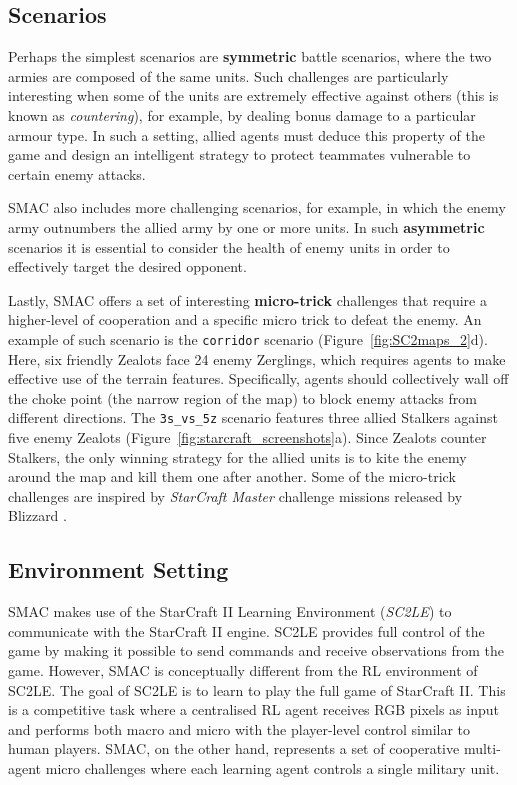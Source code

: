 \documentclass[twoside,11pt]{article}
\renewcommand{\cite}{\citep}
\begin{document}
\subsection{Scenarios}\label{appendix:SMAC_scenarios}

Perhaps the simplest scenarios are \textbf{symmetric} battle scenarios, where the two armies are composed of the same units.
Such challenges are particularly interesting when some of the units are extremely effective against others (this is known as \textit{countering}), for example, by dealing bonus damage to a particular armour type.
In such a setting, allied agents must deduce this property of the game and design an intelligent strategy to protect teammates vulnerable to certain enemy attacks.

SMAC also includes more challenging scenarios, for example, in which the enemy army outnumbers the allied army by one or more units. In such \textbf{asymmetric} scenarios it is essential to consider the health of enemy units in order to effectively target the desired opponent.

Lastly, SMAC offers a set of interesting \textbf{micro-trick} challenges that require a higher-level of cooperation and a specific micro trick to defeat the enemy. 
An example of such scenario is the \texttt{corridor} scenario (Figure~\ref{fig:SC2maps_2}d). Here, six friendly Zealots face 24 enemy Zerglings, which requires agents to make effective use of the terrain features. Specifically, agents should collectively wall off the choke point (the narrow region of the map) to block enemy attacks from different directions. 
The \texttt{3s\_vs\_5z} scenario features three allied Stalkers against five enemy Zealots (Figure~\ref{fig:starcraft_screenshots}a). Since Zealots counter Stalkers, the only winning strategy for the allied units is to kite the enemy around the map and kill them one after another.
Some of the micro-trick challenges are inspired by \textit{StarCraft Master} challenge missions released by Blizzard \cite{SC2Master}.

\subsection{Environment Setting}\label{appendix:SMAC_evn_setting}

SMAC makes use of the StarCraft II Learning Environment (\textit{SC2LE}) \cite{vinyals_starcraft_2017} to communicate with the StarCraft II engine. SC2LE provides full control of the game by making it possible to send commands and receive observations from the game. However, SMAC is conceptually different from the RL environment of SC2LE. The goal of SC2LE is to learn to play the full game of StarCraft II. This is a competitive task where a centralised RL agent receives RGB pixels as input and performs both macro and micro with the player-level control similar to human players. SMAC, on the other hand, represents a set of cooperative multi-agent micro challenges where each learning agent controls a single military unit.
\end{document}
